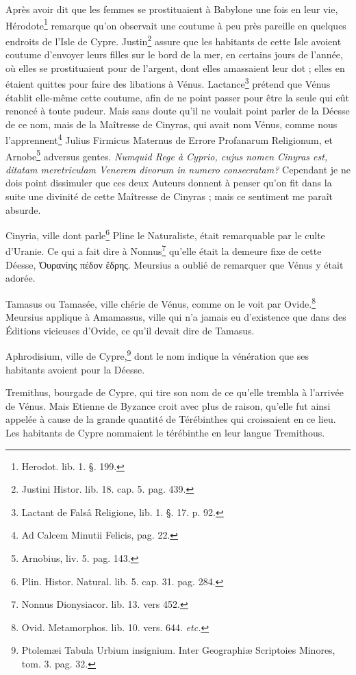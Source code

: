 \documentclass[a4paper, 18pt, oneside]{article}
\begin{document}
Après avoir dit que les femmes se prostituaient à Babylone une fois en leur vie, Hérodote\footnote{Herodot. lib. 1. §. 199.} remarque qu'on observait une coutume à peu près pareille en quelques endroits de l'Isle de Cypre. Justin\footnote{Justini Histor. lib. 18. cap. 5. pag. 439.} assure que les habitants de cette Isle avoient coutume d'envoyer leurs filles sur le bord de la mer, en certains jours de l'année, où elles se prostituaient pour de l'argent, dont elles amassaient leur dot ; elles en étaient quittes pour faire des libations à Vénus. Lactance\footnote{Lactant de Falsâ Religione, lib. 1. §. 17. p. 92.} prétend que Vénus établit elle-même cette coutume, afin de ne point passer pour être la seule qui eût renoncé à toute pudeur. Mais sans doute qu'il ne voulait point parler de la Déesse de ce nom, mais de la Maîtresse de Cinyras, qui avait nom Vénus, comme nous l'apprennent\footnote{Ad Calcem Minutii Felicis, pag. 22.} Julius Firmicus Maternus de Errore Profanarum Religionum, et Arnobe\footnote{Arnobius, liv. 5. pag. 143.} adversus gentes. \emph{Numquid Rege à Cyprio, cujus nomen Cinyras est, ditatam meretriculam Venerem divorum in numero consecratam?} Cependant je ne dois point dissimuler que ces deux Auteurs donnent à penser qu'on fit dans la suite une divinité de cette Maîtresse de Cinyras ; mais ce sentiment me paraît absurde.

Cinyria, ville dont parle\footnote{Plin. Histor. Natural. lib. 5. cap. 31. pag. 284.} Pline le Naturaliste, était remarquable par le culte d'Uranie. Ce qui a fait dire à Nonnus\footnote{Nonnus Dionysiacor. lib. 13. vers 452.} qu'elle était la demeure fixe de cette Déesse, Ὀυρανίης πέδον ἕδρης. Meursius a oublié de remarquer que Vénus y était adorée.

Tamasus ou Tamasée, ville chérie de Vénus, comme on le voit par Ovide.\footnote{Ovid. Metamorphos. lib. 10. vers. 644. \emph{etc.}} Meursius applique à Amamassus, ville qui n'a jamais eu d'existence que dans des Éditions vicieuses d'Ovide, ce qu'il devait dire de Tamasus.

Aphrodisium, ville de Cypre,\footnote{Ptolemæi Tabula Urbium insignium. Inter Geographiæ Scriptoies Minores, tom. 3. pag. 32.} dont le nom indique la vénération que ses habitants avoient pour la Déesse.

Tremithus, bourgade de Cypre, qui tire son nom de ce qu'elle trembla à l'arrivée de Vénus. Mais Etienne de Byzance croit avec plus de raison, qu'elle fut ainsi appelée à cause de la grande quantité de Térébinthes qui croissaient en ce lieu. Les habitants de Cypre nommaient le térébinthe en leur langue Tremithous.
\end{document}
